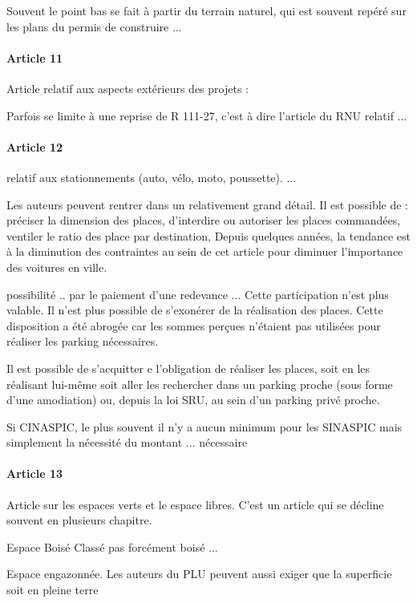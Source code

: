 			Souvent le point bas se fait à partir du terrain naturel, qui est souvent repéré sur les plans du permis de construire ...
			
			\paragraph{Article 11} Article relatif aux aspects extérieurs des projets : 
			
			Parfois se limite à une reprise de R 111-27, c'est à dire l'article du RNU relatif ...
			
			\paragraph{Article 12} relatif aux stationnements (auto, vélo, moto, poussette).  ... 
			
			Les auteurs peuvent rentrer dans un relativement grand détail. Il est possible de : préciser la dimension des places, d'interdire ou autoriser les places commandées, ventiler le ratio des place par destination, \etc Depuis quelques années, la tendance est à la diminution des contraintes au sein de cet article pour diminuer l'importance des voitures en ville.
			
			possibilité .. par le paiement d'une redevance ... Cette participation n'est plus valable. Il n'est plus possible de s'exonérer de la réalisation des places. Cette disposition a été abrogée car les sommes perçues n'étaient pas utilisées pour réaliser les parking nécessaires.
			
			Il est possible de s'acquitter e l'obligation de réaliser les places, soit en les réalisant lui-même soit aller les rechercher dans un parking proche (sous forme d'une amodiation) ou, depuis la loi SRU, au sein d'un parking privé proche.
			
			Si CINASPIC, le plus souvent il n'y a aucun minimum pour les SINASPIC mais simplement la nécessité du montant ... nécessaire
			
			\paragraph{Article 13}  Article sur les espaces verts et le espace libres. C'est un article qui se décline souvent en plusieurs chapitre.
			
			Espace Boisé Classé pas forcément boisé ...
			
			Espace engazonnée. Les auteurs du PLU peuvent aussi exiger que la superficie soit en pleine terre
			
